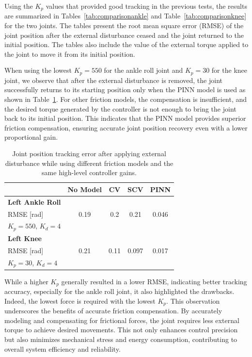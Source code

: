 Using the $K_p$ values that provided good tracking in the previous tests, the results are summarized in Tables~\ref{tab:comparisonankle} and Table~\ref{tab:comparisonknee} for the two joints. The tables present the root mean square error (RMSE) of the joint position after the external disturbance ceased and the joint returned to the initial position. The tables also include the value of the external torque applied to the joint to move it from its initial position. 

When using the lowest $K_p=550$ for the ankle roll joint and $K_p=30$ for the knee joint, we observe that after the external disturbance is removed, the joint successfully returns to its starting position only when the PINN model is used as shown in Table~\ref{tab:comparisonlowkp}. For other friction models, the compensation is insufficient, and the desired torque generated by the controller is not enough to bring the joint back to its initial position. This indicates that the PINN model provides superior friction compensation, ensuring accurate joint position recovery even with a lower proportional gain.

\begin{table}[t]
\centering
\caption{Joint position tracking error after applying external disturbance while using different friction models and the same high-level controller gains.}
\setlength{\tabcolsep}{8pt}
\begin{tabular}{lcccc}
    \toprule
    & \textbf{No Model} & \textbf{CV} & \textbf{SCV} & \textbf{PINN} \\
    \midrule
    \textbf{Left Ankle Roll} & & & & \\
    RMSE [rad] & 0.19 & 0.2  & 0.21 & 0.046 \\
    $K_p=550$, $K_d=4$ & & & & \\
    \midrule
    \textbf{Left Knee} & & & & \\
    RMSE [rad] & 0.21  & 0.11   & 0.097 & 0.017 \\
    $K_p=30$, $K_d=4$ & & & & \\
    \bottomrule
\end{tabular}
\vspace{-15pt}
\label{tab:comparisonlowkp}
\end{table}

While a higher $K_p$ generally resulted in a lower RMSE, indicating better tracking accuracy, especially for the ankle roll joint, it also highlighted the drawbacks. Indeed, the lowest force is required with the lowest $K_p$. This observation underscores the benefits of accurate friction compensation. By accurately modeling and compensating for frictional forces, the joint requires less external torque to achieve desired movements. This not only enhances control precision but also minimizes mechanical stress and energy consumption, contributing to overall system efficiency and reliability.
